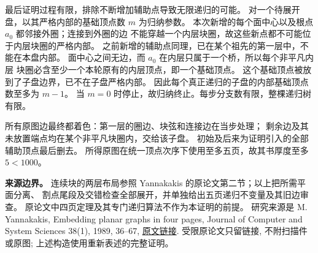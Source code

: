 \begin{solution}
最后证明过程有限，排除不断增加辅助点导致无限递归的可能。
对一个待展开盘，以其严格内部的基础顶点数 $m$ 为归纳参数。
本次新增的每个面中心以及根点 $a_0$ 都邻接外圈；连接到外圈的边
不能穿越一个内层块圈，故这些新点都不可能位于内层块圈的严格内部。
之前新增的辅助点同理，已在某个祖先的第一层中，不能在本盘内部。
面中心之间无边，而 $a_0$ 在内层只属于一个桥，所以每个非平凡内层
块圈必含至少一个本轮原有的内层顶点，即一个基础顶点。
这个基础顶点被放到了子盘边界，已不在子盘严格内部。
因此每个真正递归的子盘的内部基础顶点数至多为 $m-1$。
当 $m=0$ 时停止，故归纳终止。每步分支数有限，整棵递归树有限。

所有原图边最终都着色：第一层的圈边、块弦和连接边在当步处理；
剩余边及其未放置端点均在某个非平凡块圈内，交给该子盘。
初始及后来为证明引入的全部辅助顶点最后删去。
所得原图在统一顶点次序下使用至多五页，故其书厚度至多 $5<1000$。

\medskip
\noindent\textbf{来源边界。}
连续块的两层布局参照 Yannakakis 的原论文第二节；以上把所需平面分离、
割点尾段及交错检查全部展开，并单独给出五页递归不变量及其旧边审查。
原论文中四页定理及其专门递归算法不作为本证明的前提。
研究来源是 M. Yannakakis, Embedding planar graphs in four pages,
Journal of Computer and System Sciences 38(1), 1989, 36--67,
\href{https://page.math.tu-berlin.de/~felsner/Lehre/SemInter/Yannakakis-4pages-1989.pdf}{原文链接}.
受限原论文只留链接, 不附扫描件或原图; 上述构造使用重新表述的完整证明。
\end{solution}
